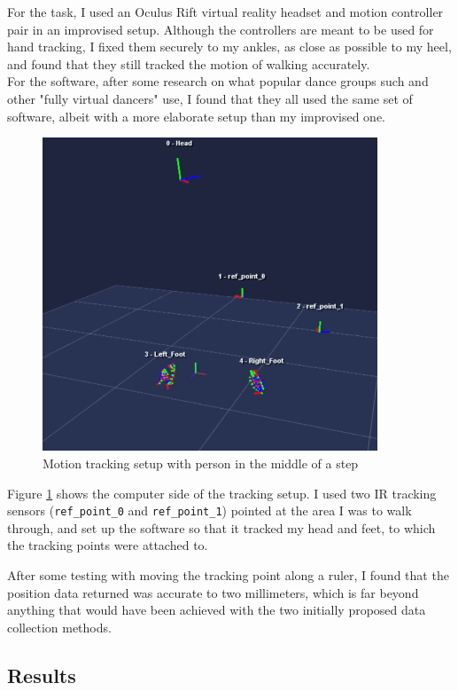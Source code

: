 \documentclass[12pt, a4paper]{article}
\begin{document}
For the task, I used an Oculus Rift virtual reality headset and motion
controller pair in an improvised setup. Although the controllers are meant to be
used for hand tracking, I fixed them securely to my ankles, as close as possible
to my heel, and found that they still tracked the motion of walking accurately.
\\

For the software, after some research on what popular dance groups such and
other "fully virtual dancers" use, I found that they all used the same set of
software, albeit with a more elaborate setup than my improvised one.

\begin{figure}[H]
    \centering
    \includegraphics[width=10cm]{mocap_software}
    \caption{Motion tracking setup with person in the middle of a step}
    \label{mocap}
\end{figure}

Figure \ref{mocap} shows the computer side of the tracking setup. I used two IR
tracking sensors (\texttt{ref\_point\_0} and \texttt{ref\_point\_1}) pointed at
the area I was to walk through, and set up the software so that it tracked my
head and feet, to which the tracking points were attached to.

After some testing with moving the tracking point along a ruler, I found that
the position data returned was accurate to two millimeters, which is far beyond
anything that would have been achieved with the two initially proposed data
collection methods.

\subsection{Results}
\end{document}
